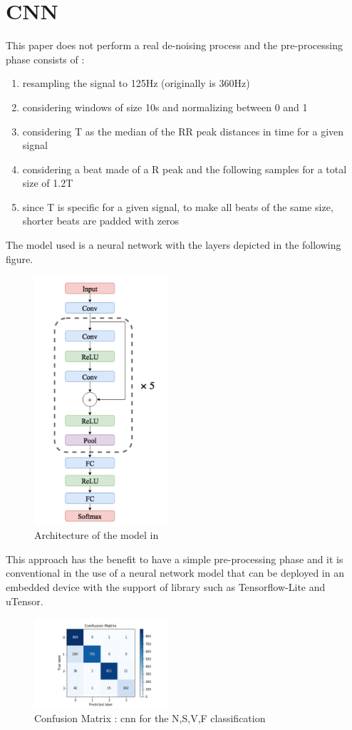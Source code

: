 \documentclass[LaM,binding=0.6cm]{sapthesis}
\begin{document}
\section{CNN  \cite{5}}
This paper does not perform a real de-noising process and the pre-processing phase consists of :
\begin{enumerate}
\item resampling the signal to 125Hz (originally is 360Hz)
\item considering windows of size 10s and normalizing between 0 and 1
\item considering T as the median of the RR peak distances in time for a given signal
\item considering a beat made of a R peak and the following samples for a total size of 1.2T
\item since T is specific for a given signal, to make all beats of the same size, shorter beats are padded with zeros
\end{enumerate}
The model used is a neural network with the layers depicted in the following figure.
\begin{figure}[H]
	\includegraphics[width=50mm,scale=0.7]{arch-cnn}
	\caption{Architecture of the model in \cite{5}}
	\label{fig:cnn1}
\end{figure}
This approach has the benefit to have a simple pre-processing phase and it is conventional in the use of a neural network model that can be deployed in an embedded device with the support of library such as Tensorflow-Lite and uTensor.
\begin{figure}[H]
	\includegraphics[width=50mm,scale=0.7]{conf-matrixno-augmentationdtrk-model.png}
	\caption{Confusion Matrix : cnn for the N,S,V,F classification}
	\label{fig:cnn1}
\end{figure}
\end{document}
